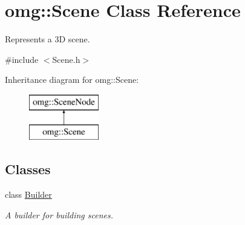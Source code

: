 \hypertarget{classomg_1_1_scene}{}\section{omg\+::Scene Class Reference}
\label{classomg_1_1_scene}


Represents a 3D scene.  




{\ttfamily \#include $<$Scene.\+h$>$}

Inheritance diagram for omg\+::Scene\+:\begin{figure}[H]
\begin{center}
\leavevmode
\includegraphics[height=2.000000cm]{classomg_1_1_scene}
\end{center}
\end{figure}
\subsection*{Classes}
\begin{DoxyCompactItemize}
\item 
class \mbox{\hyperlink{classomg_1_1_scene_1_1_builder}{Builder}}
\begin{DoxyCompactList}\small\item\em A builder for building scenes. \end{DoxyCompactList}\end{DoxyCompactItemize}

